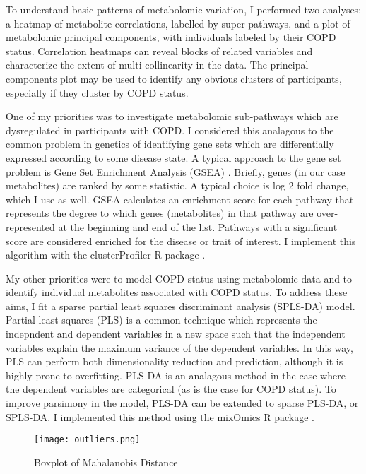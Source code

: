 \documentclass{article}
\begin{document}
To understand basic patterns of metabolomic variation, I performed two analyses: a heatmap of metabolite correlations, labelled by super-pathways, and a plot of metabolomic principal components, with individuals labeled by their COPD status. Correlation heatmaps can reveal blocks of related variables and characterize the extent of multi-collinearity in the data. The principal components plot may be used to identify any obvious clusters of participants, especially if they cluster by COPD status.

One of my priorities was to investigate metabolomic sub-pathways which are dysregulated in participants with COPD. I considered this analagous to the common problem in genetics of identifying gene sets which are differentially expressed according to some disease state. A typical approach to the gene set problem is Gene Set Enrichment Analysis (GSEA) \cite{subramanianGeneSetEnrichment2005}. Briefly, genes (in our case metabolites) are ranked by some statistic. A typical choice is log 2 fold change, which I use as well. GSEA calculates an enrichment score for each pathway that represents the degree to which genes (metabolites) in that pathway are over-represented at the beginning and end of the list. Pathways with a significant score are considered enriched for the disease or trait of interest. I implement this algorithm with the clusterProfiler R package \cite{wuClusterProfilerUniversalEnrichment2021}.

My other priorities were to model COPD status using metabolomic data and to identify individual metabolites associated with COPD status. To address these aims, I fit a sparse partial least squares discriminant analysis (SPLS-DA) model. Partial least squares (PLS) is a common technique which represents the indepndent and dependent variables in a new space such that the independent variables explain the maximum variance of the dependent variables. In this way, PLS can perform both dimensionality reduction and prediction, although it is highly prone to overfitting. PLS-DA \cite{perez-encisoPredictionClinicalOutcome2003} is an analagous method in the case where the dependent variables are categorical (as is the case for COPD status). To improve parsimony in the model, PLS-DA can be extended to sparse PLS-DA, or SPLS-DA. I implemented this method using the mixOmics R package \cite{rohartMixOmicsPackageOmics2017a}.

\begin{figure}
  \centering
  \caption{Boxplot of Mahalanobis Distance}
  \texttt{[image: outliers.png]}
  \label{fig:mahDist}
  \end{figure}
\end{document}
